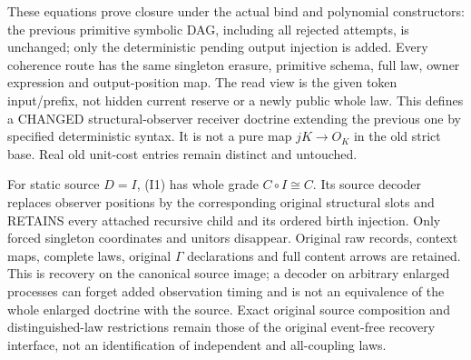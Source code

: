 \documentclass[11pt]{article}
\begin{document}
These equations prove closure under the actual bind and polynomial constructors: the previous primitive symbolic DAG, including all rejected attempts, is unchanged; only the deterministic pending output injection is added. Every coherence route has the same singleton erasure, primitive schema, full law, owner expression and output-position map. The read view is the given token input/prefix, not hidden current reserve or a newly public whole law. This defines a CHANGED structural-observer receiver doctrine extending the previous one by specified deterministic syntax. It is not a pure map $jK\to O_K$ in the old strict base. Real old unit-cost entries remain distinct and untouched.

For static source $D=I$, (I1) has whole grade $C\circ I\cong C$. Its source decoder replaces observer positions by the corresponding original structural slots and RETAINS every attached recursive child and its ordered birth injection. Only forced singleton coordinates and unitors disappear. Original raw records, context maps, complete laws, original $\Gamma$ declarations and full content arrows are retained. This is recovery on the canonical source image; a decoder on arbitrary enlarged processes can forget added observation timing and is not an equivalence of the whole enlarged doctrine with the source. Exact original source composition and distinguished-law restrictions remain those of the original event-free recovery interface, not an identification of independent and all-coupling laws.
\end{document}
